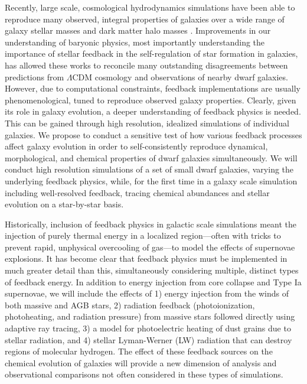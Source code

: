 \documentclass[11pt]{article}
\newcommand{\eg}{e.g.,}
\begin{document}
Recently, large scale, cosmological hydrodynamics simulations have been able to reproduce many observed, integral properties of galaxies over a wide range of galaxy stellar masses and dark matter halo masses \citep[\eg][]{MUGS2010, MAGICC2013, Illustris1, Illustris2, OWLS, EAGLE, FIRE, APOSTLE, Latte}. 
Improvements in our understanding of baryonic physics, most importantly understanding the importance of stellar feedback in the self-regulation of star formation in galaxies, has allowed these works to reconcile many outstanding disagreements between predictions from $\Lambda$CDM cosmology and observations of nearby dwarf galaxies. However, due to computational constraints, feedback implementations are usually phenomenological, tuned to reproduce observed galaxy properties. Clearly, given its role in galaxy evolution, a deeper understanding of feedback physics is needed. This can be gained through high resolution, idealized simulations of individual galaxies. We propose to conduct a sensitive test of how various feedback processes affect galaxy evolution in order to self-consistently reproduce dynamical, morphological, and chemical properties of dwarf galaxies simultaneously. We will conduct high resolution simulations of a set of small dwarf galaxies, varying the underlying feedback physics, while, for the first time in a galaxy scale simulation including well-resolved feedback, tracing chemical abundances and stellar evolution on a star-by-star basis.

Historically, inclusion of feedback physics in galactic scale simulations meant the injection of purely thermal energy in a localized region---often with tricks to prevent rapid, unphysical overcooling of gas---to model the effects of supernovae explosions. It has become clear that feedback physics must be implemented in much greater detail than this, simultaneously considering multiple, distinct types of feedback energy. In addition to energy injection from core collapse and Type Ia supernovae, we will include the effects of 1) energy injection from the winds of both massive and AGB stars, 2) radiation feedback (photoionization, photoheating, and radiation pressure) from massive stars followed directly using adaptive ray tracing, 3) a model for photoelectric heating of dust grains due to stellar radiation, and 4) stellar Lyman-Werner (LW) radiation that can destroy regions of molecular hydrogen. The effect of these feedback sources on the chemical evolution of galaxies will provide a new dimension of analysis and observational comparisons not often considered in these types of simulations.
\end{document}
